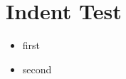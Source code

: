 \documentclass{article}
\begin{document}
  \section{Indent Test}
    \begin{itemize}
    \item first
        \item second
    \end{itemize}
\end{document}
